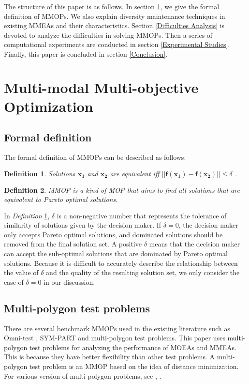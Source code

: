 \documentclass[conference]{IEEEtran}
\newtheorem{definition}{Definition}
\begin{document}
The structure of this paper is as follows. In section \ref{Multi-modal Multi-objective Optimization}, we give the formal definition of MMOPs. We also explain diversity maintenance techniques in existing MMEAs and their characteristics. Section \ref{Difficulties Analysis} is devoted to analyze the difficulties in solving MMOPs. Then a series of computational experiments are conducted in section \ref{Experimental Studies}. Finally, this paper is concluded in section \ref{Conclusion}.
\section{Multi-modal Multi-objective Optimization}
\label{Multi-modal Multi-objective Optimization}
\subsection{Formal definition}
The formal definition of MMOPs can be described as follows\cite{tanabe2019review}:

\begin{definition}
\label{def: equivalent solution}
Solutions $\boldsymbol{x_1}$ and  $\boldsymbol{x_2}$ are equivalent  iff $||\boldsymbol{f}(\boldsymbol{x_1}) - \boldsymbol{f}(\boldsymbol{x_2})|| \leq \delta$ .
\end{definition}

\begin{definition}
MMOP is a kind of MOP that aims to find all solutions that are equivalent to Pareto optimal solutions. 
\end{definition}


In \textit{Definition} \ref{def: equivalent solution}, $\delta$ is a non-negative number that represents the tolerance of similarity of solutions given by the decision maker. If $\delta = 0$, the decision maker only accepts Pareto optimal solutions, and dominated solutions should be removed from the final solution set. A positive $\delta$ means that the decision maker can accept the sub-optimal solutions that are dominated by Pareto optimal solutions. Because it is difficult to accurately describe the relationship between the value of $\delta$ and the quality of the resulting solution set, we only consider the case of $\delta =0$ in our discussion. 

\subsection{Multi-polygon test problems}
There are several benchmark MMOPs used in the existing literature such as Omni-test \cite{deb2005omni} , SYM-PART \cite{rudolph2007capabilities} and multi-polygon\cite{ishibuchi2019salable} test problems. This paper uses multi-polygon test problems for analyzing the performance of MOEAs and MMEAs. This is because they have better flexibility than other test problems. A multi-polygon test problem is an MMOP based on the idea of distance minimization. For various version of multi-polygon problems, see \cite{fieldsend2019feature}, \cite{nojima2019constrained}.
\end{document}
